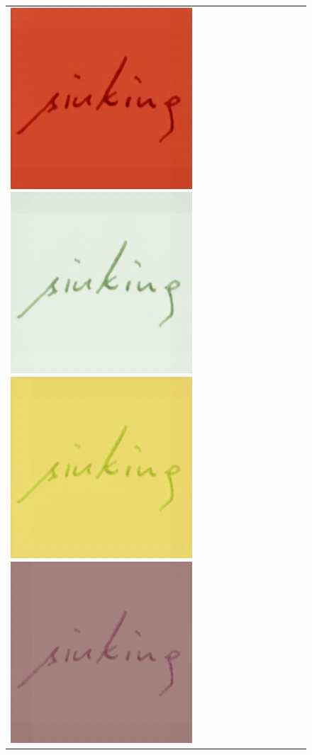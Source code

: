 \begin{figure}
\begin{tabular}{lc}
{  \includegraphics[scale=0.18]{../assets/background_style_transfer/spade/result_pix2pix/45.png}%
  \includegraphics[scale=0.18]{../assets/background_style_transfer/spade/result_pix2pix/46.png}%
  \includegraphics[scale=0.18]{../assets/background_style_transfer/spade/result_pix2pix/49.png}%
  \includegraphics[scale=0.18]{../assets/background_style_transfer/spade/result_pix2pix/31.png}%
}
\end{tabular}
\end{figure}
